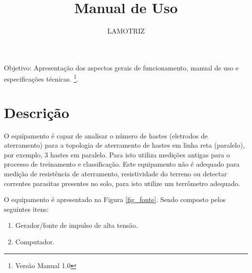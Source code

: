 \documentclass[a4paper, 10pt]{article}
\title{Manual de Uso}
\author{LAMOTRIZ}
\begin{document}
\maketitle

Objetivo: Apresentação dos aspectos gerais de funcionamento, manual de uso e 
especificações técnicas.
\footnote{Versão Manual 1.0}.


\newpage

\tableofcontents

\newpage

\listoffigures

\newpage

\section{Descrição}

O equipamento é capaz de analisar o número de hastes
(eletrodos de aterramento) para a topologia de aterramento
de hastes em linha reta (paralelo), por exemplo, 3 hastes em paralelo. 
Para isto utiliza medições antigas para o processo de treinamento e 
classificação. Este equipamento não é adequado para medição de 
resistência de aterramento, resistividade do terreno ou detectar correntes 
parasitas presentes no solo, para isto utilize um terrômetro adequado. 

O equipamento é apresentado na Figura \ref{fig_fonte}. Sendo composto pelos 
seguintes itens:


\begin{enumerate}
    \item Gerador/fonte de impulso de alta tensão.
    \item Computador.
\end{enumerate}
\end{document}
